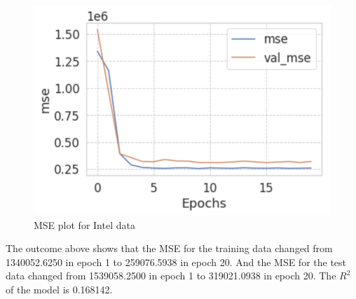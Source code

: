 \documentclass{scrartcl}
\begin{document}
\begin{figure}[H]
	\begin{center}
		\includegraphics[scale=1.0]{Graphics/Neural Network Images/NN23.png}
	\end{center}
	\caption{MSE plot for Intel data}
	\label{fig:NN23}
\end{figure}

\noindent The outcome above shows that the MSE for the training data changed from 1340052.6250 in epoch 1 to 259076.5938 in epoch 20. And the MSE for the test data changed from 1539058.2500 in epoch 1 to 319021.0938 in epoch 20. The $R^2$ of the model is 0.168142. \\





\end{document}
